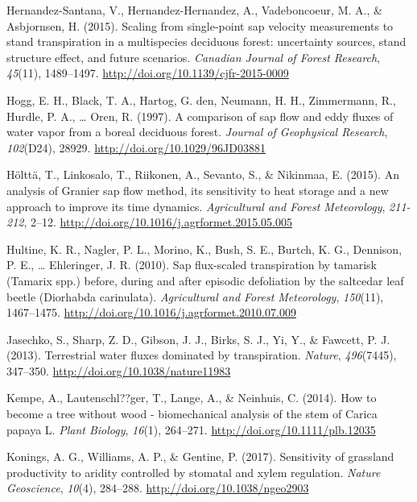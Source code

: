 \documentclass[11pt,twoside]{reedthesis}
\begin{document}
\hypertarget{ref-Hernandez-Santana2015}{}
Hernandez-Santana, V., Hernandez-Hernandez, A., Vadeboncoeur, M. A., \&
Asbjornsen, H. (2015). Scaling from single-point sap velocity
measurements to stand transpiration in a multispecies deciduous forest:
uncertainty sources, stand structure effect, and future scenarios.
\emph{Canadian Journal of Forest Research}, \emph{45}(11), 1489--1497.
\url{http://doi.org/10.1139/cjfr-2015-0009}

\hypertarget{ref-Hogg1997}{}
Hogg, E. H., Black, T. A., Hartog, G. den, Neumann, H. H., Zimmermann,
R., Hurdle, P. A., \ldots{} Oren, R. (1997). A comparison of sap flow
and eddy fluxes of water vapor from a boreal deciduous forest.
\emph{Journal of Geophysical Research}, \emph{102}(D24), 28929.
\url{http://doi.org/10.1029/96JD03881}

\hypertarget{ref-Holtta2015}{}
Hölttä, T., Linkosalo, T., Riikonen, A., Sevanto, S., \& Nikinmaa, E.
(2015). An analysis of Granier sap flow method, its sensitivity to heat
storage and a new approach to improve its time dynamics.
\emph{Agricultural and Forest Meteorology}, \emph{211-212}, 2--12.
\url{http://doi.org/10.1016/j.agrformet.2015.05.005}

\hypertarget{ref-Hultine2010}{}
Hultine, K. R., Nagler, P. L., Morino, K., Bush, S. E., Burtch, K. G.,
Dennison, P. E., \ldots{} Ehleringer, J. R. (2010). Sap flux-scaled
transpiration by tamarisk (Tamarix spp.) before, during and after
episodic defoliation by the saltcedar leaf beetle (Diorhabda
carinulata). \emph{Agricultural and Forest Meteorology}, \emph{150}(11),
1467--1475. \url{http://doi.org/10.1016/j.agrformet.2010.07.009}

\hypertarget{ref-Jasechko2013}{}
Jasechko, S., Sharp, Z. D., Gibson, J. J., Birks, S. J., Yi, Y., \&
Fawcett, P. J. (2013). Terrestrial water fluxes dominated by
transpiration. \emph{Nature}, \emph{496}(7445), 347--350.
\url{http://doi.org/10.1038/nature11983}

\hypertarget{ref-Kempe2014}{}
Kempe, A., Lautenschl??ger, T., Lange, A., \& Neinhuis, C. (2014). How
to become a tree without wood - biomechanical analysis of the stem of
Carica papaya L. \emph{Plant Biology}, \emph{16}(1), 264--271.
\url{http://doi.org/10.1111/plb.12035}

\hypertarget{ref-Konings2017}{}
Konings, A. G., Williams, A. P., \& Gentine, P. (2017). Sensitivity of
grassland productivity to aridity controlled by stomatal and xylem
regulation. \emph{Nature Geoscience}, \emph{10}(4), 284--288.
\url{http://doi.org/10.1038/ngeo2903}
\end{document}

